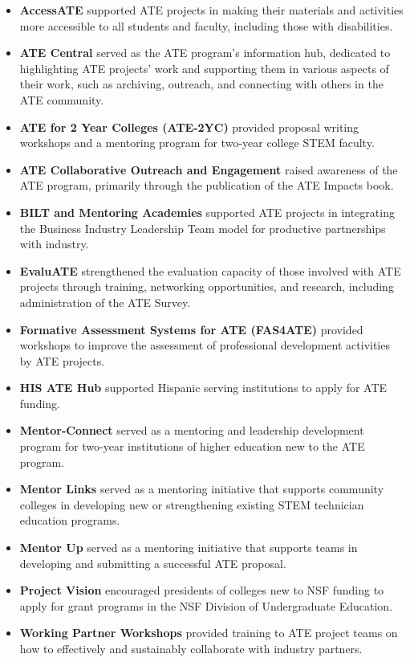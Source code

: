\documentclass[
]{report}
\providecommand{\tightlist}{%
  \setlength{\itemsep}{0pt}\setlength{\parskip}{0pt}}
\begin{document}
\begin{itemize}
\tightlist
\item
  \textbf{AccessATE} supported ATE projects in making their materials and activities more accessible to all students and faculty, including those with disabilities.
\item
  \textbf{ATE Central} served as the ATE program's information hub, dedicated to highlighting ATE projects' work and supporting them in various aspects of their work, such as archiving, outreach, and connecting with others in the ATE community.
\item
  \textbf{ATE for 2 Year Colleges (ATE-2YC)} provided proposal writing workshops and a mentoring program for two-year college STEM faculty.
\item
  \textbf{ATE Collaborative Outreach and Engagement} raised awareness of the ATE program, primarily through the publication of the ATE Impacts book.
\item
  \textbf{BILT and Mentoring Academies} supported ATE projects in integrating the Business Industry Leadership Team model for productive partnerships with industry.
\item
  \textbf{EvaluATE} strengthened the evaluation capacity of those involved with ATE projects through training, networking opportunities, and research, including administration of the ATE Survey.
\item
  \textbf{Formative Assessment Systems for ATE (FAS4ATE)} provided workshops to improve the assessment of professional development activities by ATE projects.
\item
  \textbf{HIS ATE Hub} supported Hispanic serving institutions to apply for ATE funding.
\item
  \textbf{Mentor-Connect} served as a mentoring and leadership development program for two-year institutions of higher education new to the ATE program.
\item
  \textbf{Mentor Links} served as a mentoring initiative that supports community colleges in developing new or strengthening existing STEM technician education programs.
\item
  \textbf{Mentor Up} served as a mentoring initiative that supports teams in developing and submitting a successful ATE proposal.
\item
  \textbf{Project Vision} encouraged presidents of colleges new to NSF funding to apply for grant programs in the NSF Division of Undergraduate Education.
\item
  \textbf{Working Partner Workshops} provided training to ATE project teams on how to effectively and sustainably collaborate with industry partners.
\end{itemize}
\end{document}
